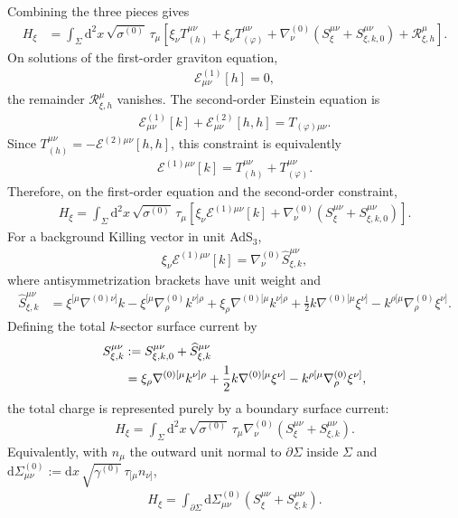 \documentclass[11pt]{article}
\newcommand{\dd}{\mathrm{d}}
\newcommand{\cE}{\mathcal{E}}
\newcommand{\cR}{\mathcal{R}}
\begin{document}
Combining the three pieces gives
\begin{align}
  H_\xi
  &=\int_\Sigma\dd^2x\,\sqrt{\sigma^{(0)}}\,\tau_\mu
    \left[
      \xi_\nu T_{(h)}^{\mu\nu}
      +\xi_\nu T_{(\varphi)}^{\mu\nu}
      +\nabla^{(0)}_\nu
       \left(S_\xi^{\mu\nu}+S_{\xi,k,0}^{\mu\nu}\right)
      +\cR^\mu_{\xi,h}
    \right].
\end{align}
On solutions of the first-order graviton equation,
\begin{align}
  \cE^{(1)}_{\mu\nu}[h]=0,
\end{align}
the remainder $\cR^\mu_{\xi,h}$ vanishes. The second-order Einstein equation
is
\begin{align}
  \cE^{(1)}_{\mu\nu}[k]
  +\cE^{(2)}_{\mu\nu}[h,h]
  =T_{(\varphi)\mu\nu}.
\end{align}
Since $T_{(h)}^{\mu\nu}=-\cE^{(2)\mu\nu}[h,h]$, this constraint is equivalently
\begin{align}
  \cE^{(1)\mu\nu}[k]
  =T_{(h)}^{\mu\nu}+T_{(\varphi)}^{\mu\nu}.
\end{align}
Therefore, on the first-order equation and the second-order constraint,
\begin{align}
  H_\xi
  =\int_\Sigma\dd^2x\,\sqrt{\sigma^{(0)}}\,\tau_\mu
    \left[
      \xi_\nu\cE^{(1)\mu\nu}[k]
      +\nabla^{(0)}_\nu
       \left(S_\xi^{\mu\nu}+S_{\xi,k,0}^{\mu\nu}\right)
    \right].
\end{align}
For a background Killing vector in unit AdS$_3$,
\begin{align}
  \xi_\nu\cE^{(1)\mu\nu}[k]
  =\nabla^{(0)}_\nu\widehat S_{\xi,k}^{\mu\nu},
\end{align}
where antisymmetrization brackets have unit weight and
\begin{align}
  \widehat S_{\xi,k}^{\mu\nu}
  &=\xi^{[\mu}\nabla^{(0)\nu]}k
    -\xi^{[\mu}\nabla^{(0)}_\rho k^{\nu]\rho}
    +\xi_\rho\nabla^{(0)[\mu}k^{\nu]\rho}
    +\frac12 k\nabla^{(0)[\mu}\xi^{\nu]}
    -k^{\rho[\mu}\nabla^{(0)}_\rho\xi^{\nu]}.
\end{align}
Defining the total $k$-sector surface current by
\begin{align}
  S_{\xi,k}^{\mu\nu}
  &:=S_{\xi,k,0}^{\mu\nu}+\widehat S_{\xi,k}^{\mu\nu} \notag\\
  &=\xi_\rho\nabla^{(0)[\mu}k^{\nu]\rho}
    +\frac12 k\nabla^{(0)[\mu}\xi^{\nu]}
    -k^{\rho[\mu}\nabla^{(0)}_\rho\xi^{\nu]},
\end{align}
the total charge is represented purely by a boundary surface current:
\begin{align}
  H_\xi
  =\int_\Sigma\dd^2x\,\sqrt{\sigma^{(0)}}\,\tau_\mu
    \nabla^{(0)}_\nu
    \left(S_\xi^{\mu\nu}+S_{\xi,k}^{\mu\nu}\right).
\end{align}
Equivalently, with $n_\mu$ the outward unit normal to $\partial\Sigma$ inside
$\Sigma$ and
$\dd\Sigma^{(0)}_{\mu\nu}
  :=\dd x\,\sqrt{\gamma^{(0)}}\,\tau_{[\mu}n_{\nu]}$,
\begin{align}
  H_\xi
  =\int_{\partial\Sigma}\dd\Sigma^{(0)}_{\mu\nu}
    \left(S_\xi^{\mu\nu}+S_{\xi,k}^{\mu\nu}\right).
\end{align}
\end{document}

